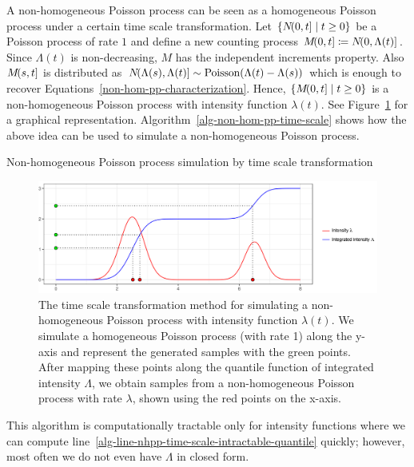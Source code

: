\documentclass[report.tex]{subfiles}
\begin{document}
A non-homogeneous Poisson process can be seen as a homogeneous Poisson process
under a certain time scale transformation.
Let $\{{N}\!({0},{t}] \mid t \geq 0\}$
be a Poisson process of rate $1$ and define a new counting process
${M}\!({0},{t}] \coloneqq {N}\!({0},{\Lambda(t)}]$.
Since $\Lambda(t)$ is non-decreasing, $M$ has the independent increments property.
Also ${M}\!({s},{t}]$ is distributed as
${N}\!({\Lambda(s)},{\Lambda(t)}] \sim \text{Poisson}(\Lambda(t) - \Lambda(s))$
which is enough to recover Equations~\ref{non-hom-pp-characterization}.
Hence, $\{{M}\!({0},{t}] \mid t \geq 0\}$ is a non-homogeneous Poisson process
with intensity function $\lambda(t)$. See Figure~\ref{image-pp-time-scale-transformation}
for a graphical representation.
Algorithm~\ref{alg-non-hom-pp-time-scale} shows how the above idea can be used to
simulate a non-homogeneous Poisson process.
\begin{algorithm}
\caption{Non-homogeneous Poisson process simulation by time scale transformation}
\label{alg-non-hom-pp-time-scale}
\begin{algorithmic}[1]
      \label{alg-line-nhpp-time-scale-intractable-quantile}
  \EndFor
\end{algorithmic}
\end{algorithm}
\begin{figure}
  \includegraphics[width=\textwidth]{img/ch2-pp-time-scale}
  \caption{The time scale transformation method for simulating a
  non-homogeneous Poisson process with intensity function $\lambda(t)$.
  We simulate a homogeneous Poisson process (with rate 1) along the y-axis
  and represent the generated samples with the green points.
  After mapping these points along the quantile function of integrated intensity
  $\Lambda$, we obtain
  samples from a non-homogeneous Poisson process with rate $\lambda$, shown
  using the red points on the x-axis.}
  \label{image-pp-time-scale-transformation}
\end{figure}
This algorithm is computationally tractable only for intensity functions
where we can compute line~\ref{alg-line-nhpp-time-scale-intractable-quantile}
quickly; however, most often we do not even have $\Lambda$ in closed form.
\end{document}
